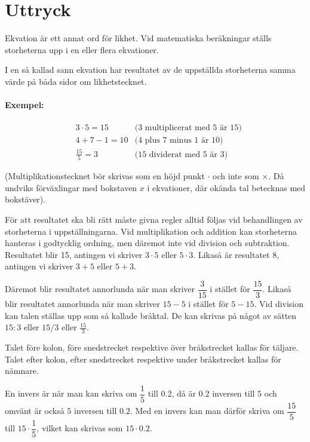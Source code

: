 \section{Uttryck}

Ekvation är ett annat ord för likhet.
Vid matematiska beräkningar ställs storheterna upp i en eller flera ekvationer.

I en så kallad sann ekvation har resultatet av de uppställda storheterna samma %
värde på båda sidor om likhetstecknet.

\paragraph{Exempel:}

\begin{align*}
 & 3 \cdot 5 = 15   & \text{(3 multiplicerat med 5 är 15)} \\
 & 4 + 7 - 1 = 10   & \text{(4 plus 7 minus 1 är 10)}      \\
 & \frac{15}{5} = 3 & \text{(15 dividerat med 5 är 3)}
\end{align*}

(Multiplikationstecknet bör skrivas som en höjd punkt \(\cdot\) och inte som
\(\times\).
Då undviks förväxlingar med bokstaven \(x\) i ekvationer, där okända tal
betecknas med bokstäver).

För att resultatet ska bli rätt måste givna regler alltid följas vid
behandlingen av storheterna i uppställningarna.
Vid multiplikation och addition kan storheterna hanteras i godtycklig ordning,
men däremot inte vid division och subtraktion.
Resultatet blir 15, antingen vi skriver \(3 \cdot 5\) eller \(5 \cdot 3\).
Likaså är resultatet 8, antingen vi skriver \(3 + 5\) eller \(5 + 3\).

Däremot blir resultatet annorlunda när man skriver \(\dfrac{3}{15}\) i stället
för \(\dfrac{15}{3}\).
Likaså blir resultatet annorlunda när man skriver \(15 - 5\) i stället för
\(5 - 15\).
Vid division kan talen ställas upp som så kallade bråktal.
De kan skrivas på något av sätten \(15:3\) eller \(15/3\) eller
\(\frac{15}{3}\).

Talet före kolon, före snedstrecket respektive över bråkstrecket kallas för
täljare.
Talet efter kolon, efter snedstrecket respektive under bråkstrecket kallas för
nämnare.

En invers är när man kan skriva om \(\dfrac{1}{5}\) till \(0.2\), då är
\(0.2\) inversen till \(5\) och omvänt är också \(5\) inversen till \(0.2\).
Med en invers kan man därför skriva om \(\dfrac{15}{5}\) till
\(15 \cdot \dfrac{1}{5}\), vilket kan skrivas som  \(15 \cdot 0.2\).

